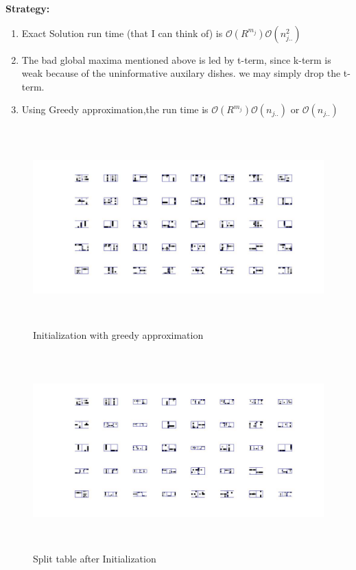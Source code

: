 \documentclass{article}
\begin{document}
\begin{spacing}{1.1}
{\bf Strategy:}\\
\begin{enumerate}
\item Exact Solution run time (that I can think of) is $\mathcal{O}(R^{m_{j}})\mathcal{O}(n_{j..}^2)$
\item The bad global maxima mentioned above is led by t-term, since k-term is weak because of the uninformative auxilary dishes. we may simply drop the t-term.
\item Using Greedy approximation,the run time is $\mathcal{O}(R^{m_{j}})\mathcal{O}(n_{j..})$ or $\mathcal{O}(n_{j..})$
\end{enumerate}
\begin{figure}
    \centering 
    \includegraphics[width=7in,height=3in]{greedy.jpg} 
    \caption{Initialization with greedy approximation}
\end{figure}
\begin{figure}
    \centering 
    \includegraphics[width=7in,height=3in]{greedy_split.jpg} 
    \caption{Split table after Initialization}
\end{figure}




\end{spacing}
\end{document}
